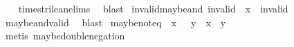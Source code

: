\begin{isabellebody}
%
\isadelimproof
\ \ %
\endisadelimproof
%
\isatagproof
{}\isamarkupfalse%
\ times{\isacharunderscore}trilean{\isachardot}elims\ \isamarkupfalse%
\ blast%
\endisatagproof
{\isafoldproof}%
%
\isadelimproof
\isanewline
%
\endisadelimproof
\isanewline
{}\isamarkupfalse%
\ invalid{\isacharunderscore}maybe{\isacharunderscore}and{\isacharcolon}\ {\isachardoublequoteopen}invalid\ {\isasymand}\isactrlsub {\isacharquery}\ x\ {\isacharequal}\ invalid{\isachardoublequoteclose}\isanewline
%
\isadelimproof
\ \ %
\endisadelimproof
%
\isatagproof
{}\isamarkupfalse%
\ maybe{\isacharunderscore}and{\isacharunderscore}valid\ \isamarkupfalse%
\ blast%
\endisatagproof
{\isafoldproof}%
%
\isadelimproof
\isanewline
%
\endisadelimproof
\isanewline
{}\isamarkupfalse%
\ maybe{\isacharunderscore}not{\isacharunderscore}eq{\isacharcolon}\ {\isachardoublequoteopen}{\isacharparenleft}{\isasymnot}\isactrlsub {\isacharquery}\ x\ {\isacharequal}\ {\isasymnot}\isactrlsub {\isacharquery}\ y{\isacharparenright}\ {\isacharequal}\ {\isacharparenleft}x\ {\isacharequal}\ y{\isacharparenright}{\isachardoublequoteclose}\isanewline
%
\isadelimproof
\ \ %
\endisadelimproof
%
\isatagproof
{}\isamarkupfalse%
\ {\isacharparenleft}metis\ maybe{\isacharunderscore}double{\isacharunderscore}negation{\isacharparenright}%
\endisatagproof
{\isafoldproof}%
%
\isadelimproof
\isanewline
%
\endisadelimproof
%
\isadelimtheory
%
\endisadelimtheory
%
\isatagtheory
{}\isamarkupfalse%
%
\endisatagtheory
{\isafoldtheory}%
%
\isadelimtheory
%
\endisadelimtheory
%
\end{isabellebody}%
\endinput
